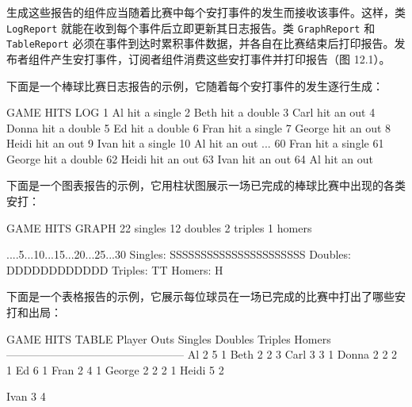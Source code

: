 生成这些报告的组件应当随着比赛中每个安打事件的发生而接收该事件。这样，类 \texttt{LogReport} 就能在收到每个事件后立即更新其日志报告。类 \texttt{Graph\allowbreak{}Report} 和 \texttt{Table\allowbreak{}Report} 必须在事件到达时累积事件数据，并各自在比赛结束后打印报告。发布者组件产生安打事件，订阅者组件消费这些安打事件并打印报告（图 12.1）。


下面是一个棒球比赛日志报告的示例，它随着每个安打事件的发生逐行生成：

\begin{codebox}
GAME HITS LOG
 1     Al hit a single
 2   Beth hit a double
 3   Carl hit an out
 4  Donna hit a double
 5     Ed hit a double
 6   Fran hit a single
 7 George hit an out
 8  Heidi hit an out
 9   Ivan hit a single
10     Al hit an out
...
60   Fran hit a single
61 George hit a double
62  Heidi hit an out
63   Ivan hit an out
64     Al hit an out
\end{codebox}

下面是一个图表报告的示例，它用柱状图展示一场已完成的棒球比赛中出现的各类安打：

\begin{codebox}
GAME HITS GRAPH
22 singles
12 doubles
 2 triples
 1 homers
 
         ....5...10...15...20...25...30
Singles: SSSSSSSSSSSSSSSSSSSSSS
Doubles: DDDDDDDDDDDD
Triples: TT
 Homers: H
\end{codebox}

下面是一个表格报告的示例，它展示每位球员在一场已完成的比赛中打出了哪些安打和出局：

\begin{codebox}
GAME HITS TABLE
Player     Outs   Singles Doubles Triples Homers
------------------------------------------------
Al           2       5       1                
Beth         2       2       3                
Carl         3       3       1                
Donna        2       2       2       1        
Ed           6               1                
Fran         2       4                       1
George       2       2       2       1        
Heidi        5               2                

Ivan         3       4                        
\end{codebox}


